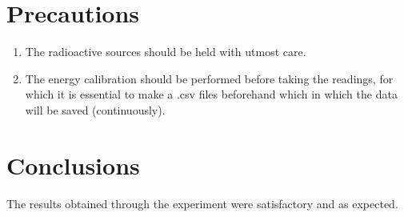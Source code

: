 \documentclass[%
 reprint,
nofootinbib,
 amsmath,amssymb,
 aps,
floatfix,
]{revtex4-2}
\begin{document}
\section{Precautions}
    \begin{enumerate}
        \item The radioactive sources should be held with utmost care.
        \item The energy calibration should be performed before taking the readings, for which it is essential to make a .csv files beforehand which in which the data will be saved (continuously).
    \end{enumerate}
\section{Conclusions}
    The results obtained through the experiment were satisfactory and as expected.
\end{document}
